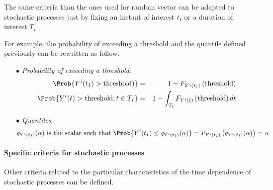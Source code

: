 The same criteria than the ones used for random vector can be adapted to stochastic processes just by fixing an instant of interest $t_I$ or a duration of interest $T_I$.

For example, the probability of exceeding a threshold and the quantile defined previously can be rewritten as follow.

\begin{itemize}
\item[$\bullet$] {\em Probability of exceeding a threshold}:
  \begin{eqnarray*}
    \Prob{Y^i(t_I) > \textrm{threshold})} &=& 1 - F_{Y^i(t_I)} \left( \textrm{threshold} \right)
    \\
    \Prob{Y^i(t) > \textrm{threshold} ; t \in T_I} &=& 1 - \int_{T_i} F_{Y^i(t)}\left( \textrm{threshold} \right) dt
  \end{eqnarray*}

\item[$\bullet$] {\em Quantiles}:
  \begin{align*}
    q_{Y^i(t_I)}(\alpha) \ \textrm{is the scalar such that}\ \Prob{Y^i(t_I) \leq q_{Y^i(t_I)}(\alpha)} = F_{Y^i(t_I)} \left( q_{Y^i(t_I)}(\alpha) \right) = \alpha
  \end{align*}
\end{itemize}


\paragraph{Specific criteria for stochastic processes}
\par
Other criteria related to the particular characteristics of the time dependence of stochastic processes can be defined.


